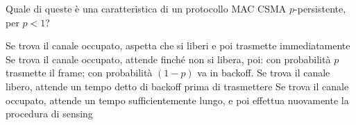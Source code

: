 \question
Quale di queste è una caratteristica di un protocollo MAC CSMA \(p\)-persistente, per \(p < 1\)?

\begin{checkboxes}
	\choice Se trova il canale occupato, aspetta che si liberi e poi trasmette immediatamente
	\CorrectChoice Se trova il canale occupato, attende finché non si libera, poi: con probabilità \(p\) trasmette il frame; con probabilità \((1-p)\) va in backoff.
	\choice Se trova il canale libero, attende un tempo detto di backoff prima di trasmettere
	\choice Se trova il canale occupato, attende un tempo sufficientemente lungo, e poi effettua nuovamente la procedura di sensing
\end{checkboxes}
